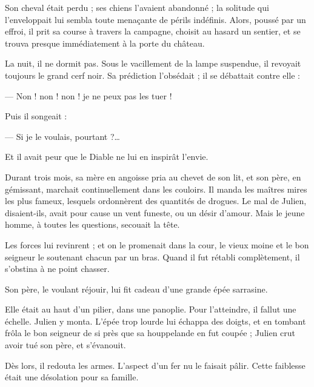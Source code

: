 \documentclass[]{book}
\begin{document}
                Son cheval était perdu ; ses chiens l'avaient abandonné ; la solitude qui l'enveloppait lui sembla toute menaçante de périls indéfinis. Alors, poussé par un effroi, il prit sa course à travers la campagne, choisit au hasard un sentier, et se trouva presque immédiatement à la porte du château.
                    
                La nuit, il ne dormit pas. Sous le vacillement de la lampe suspendue, il revoyait toujours le grand cerf noir. Sa prédiction l'obsédait ; il se débattait contre elle :
                    
                — Non ! non ! non ! je ne peux pas les tuer !
                    
                Puis il songeait :
                    
                — Si je le voulais, pourtant ?…
                    
                Et il avait peur que le Diable ne lui en inspirât l'envie.
                    
                Durant trois mois, sa mère en angoisse pria au chevet de son lit, et son père, en gémissant, marchait continuellement dans les couloirs. Il manda les maîtres mires les plus fameux, lesquels ordonnèrent des quantités de drogues. Le mal de Julien, disaient-ils, avait pour cause un vent funeste, ou un désir d'amour. Mais le jeune homme, à toutes les questions, secouait la tête.
                    
                Les forces lui revinrent ; et on le promenait dans la cour, le vieux moine et le bon seigneur le soutenant chacun par un bras. Quand il fut rétabli complètement, il s'obstina à ne point chasser.
                    
                Son père, le voulant réjouir, lui fit cadeau d'une grande épée sarrasine.
                    
                Elle était au haut d'un pilier, dans une panoplie. Pour l'atteindre, il fallut une échelle. Julien y monta. L'épée trop lourde lui échappa des doigts, et en tombant frôla le bon seigneur de si près que sa houppelande en fut coupée ; Julien crut avoir tué son père, et s'évanouit.
                    
                Dès lors, il redouta les armes. L'aspect d'un fer nu le faisait pâlir. Cette faiblesse était une désolation pour sa famille.
                    
\end{document}
